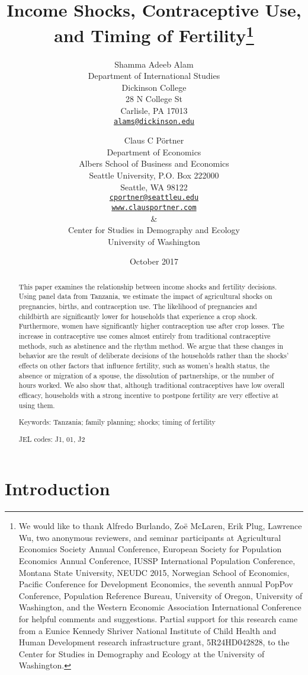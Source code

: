 \documentclass[letterpaper,12pt]{article}
\title{Income Shocks, Contraceptive Use,\\ and Timing of Fertility\thanks{%
We would like to thank 
Alfredo Burlando,
Zo\"e McLaren, 
Erik Plug,
Lawrence Wu, 
two anonymous reviewers, 
and seminar participants at 
Agricultural Economics Society Annual Conference,
European Society for Population Economics Annual Conference,
IUSSP International Population Conference,
Montana State University, 
NEUDC 2015,
Norwegian School of Economics, 
Pacific Conference for Development Economics, 
the seventh annual PopPov Conference, 
Population Reference Bureau,
University of Oregon,
University of Washington,
and the 
Western Economic Association International Conference
for helpful comments and suggestions.
Partial support for this research came from a Eunice Kennedy Shriver National
Institute of Child Health and Human Development research infrastructure grant,
5R24HD042828, to the Center for Studies in Demography and Ecology at the
University of Washington.
}}
\author{Shamma Adeeb Alam\\
	Department of International Studies\\
	Dickinson College\\
	28 N College St\\
	Carlisle, PA 17013\\
	\href{mailto:alams@dickinson.edu}{\texttt{alams@dickinson.edu}}\\
\and
	Claus C P\"ortner\\
    Department of Economics\\
    Albers School of Business and Economics\\
    Seattle University, P.O. Box 222000\\
    Seattle, WA 98122\\
    \href{mailto:cportner@seattleu.edu}{\texttt{cportner@seattleu.edu}}\\
    \href{http://www.clausportner.com}{\texttt{www.clausportner.com}}\\
    \& \\
    Center for Studies in Demography and Ecology \\
    University of Washington\\ 
    }
\date{October 2017}
\begin{document}
\def\sym#1{\ifmmode^{#1}\else\(^{#1}\)\fi}

\setcounter{page}{0}
\maketitle
\thispagestyle{empty}

\newpage
\setcounter{page}{0}
\thispagestyle{empty}

\doublespacing


\begin{abstract} 
\noindent This paper examines the relationship between income 
shocks and fertility decisions. 
Using panel data from Tanzania, we estimate the impact of agricultural shocks 
on 
pregnancies, 
births, 
and 
contraception use.
The likelihood of 
pregnancies and childbirth are significantly lower for households that experience
a crop shock.
Furthermore, women have significantly higher contraception use after 
crop losses. 
The increase in contraceptive use comes almost entirely from traditional 
contraceptive methods, such as abstinence and the rhythm method.
We argue that these changes in behavior are the result of deliberate decisions of
the households rather than the shocks' effects on other factors that influence
fertility, such as women's health status, the absence or migration of a spouse, 
the dissolution of partnerships, or the number of hours worked. 
We also show that, although traditional contraceptives have low overall
efficacy, households with a strong incentive to postpone fertility
are very effective at using them.

\noindent Keywords: Tanzania; family planning; shocks; timing of fertility

\noindent JEL codes: J1, 01, J2
\end{abstract}

\newpage


\section{Introduction}
\end{document}
